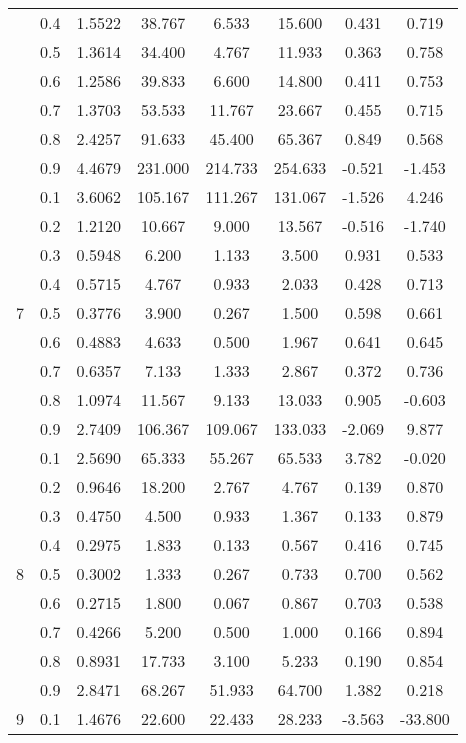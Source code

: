 \documentclass[11pt,a4paper]{report}
\begin{document}
\begin{longtable}{ | c | c || c | c | c | c | c | c | }
 & 0.4 & 1.5522 & 38.767 & 6.533 & 15.600 & 0.431 & 0.719 \\
 & 0.5 & 1.3614 & 34.400 & 4.767 & 11.933 & 0.363 & 0.758 \\
 & 0.6 & 1.2586 & 39.833 & 6.600 & 14.800 & 0.411 & 0.753 \\
 & 0.7 & 1.3703 & 53.533 & 11.767 & 23.667 & 0.455 & 0.715 \\
 & 0.8 & 2.4257 & 91.633 & 45.400 & 65.367 & 0.849 & 0.568 \\
 & 0.9 & 4.4679 & 231.000 & 214.733 & 254.633 & -0.521 & -1.453 \\
 \hline
\multirow{9}{*}{7} & 0.1 & 3.6062 & 105.167 & 111.267 & 131.067 & -1.526 & 4.246 \\
 & 0.2 & 1.2120 & 10.667 & 9.000 & 13.567 & -0.516 & -1.740 \\
 & 0.3 & 0.5948 & 6.200 & 1.133 & 3.500 & 0.931 & 0.533 \\
 & 0.4 & 0.5715 & 4.767 & 0.933 & 2.033 & 0.428 & 0.713 \\
 & 0.5 & 0.3776 & 3.900 & 0.267 & 1.500 & 0.598 & 0.661 \\
 & 0.6 & 0.4883 & 4.633 & 0.500 & 1.967 & 0.641 & 0.645 \\
 & 0.7 & 0.6357 & 7.133 & 1.333 & 2.867 & 0.372 & 0.736 \\
 & 0.8 & 1.0974 & 11.567 & 9.133 & 13.033 & 0.905 & -0.603 \\
 & 0.9 & 2.7409 & 106.367 & 109.067 & 133.033 & -2.069 & 9.877 \\
 \hline
\multirow{9}{*}{8} & 0.1 & 2.5690 & 65.333 & 55.267 & 65.533 & 3.782 & -0.020 \\
 & 0.2 & 0.9646 & 18.200 & 2.767 & 4.767 & 0.139 & 0.870 \\
 & 0.3 & 0.4750 & 4.500 & 0.933 & 1.367 & 0.133 & 0.879 \\
 & 0.4 & 0.2975 & 1.833 & 0.133 & 0.567 & 0.416 & 0.745 \\
 & 0.5 & 0.3002 & 1.333 & 0.267 & 0.733 & 0.700 & 0.562 \\
 & 0.6 & 0.2715 & 1.800 & 0.067 & 0.867 & 0.703 & 0.538 \\
 & 0.7 & 0.4266 & 5.200 & 0.500 & 1.000 & 0.166 & 0.894 \\
 & 0.8 & 0.8931 & 17.733 & 3.100 & 5.233 & 0.190 & 0.854 \\
 & 0.9 & 2.8471 & 68.267 & 51.933 & 64.700 & 1.382 & 0.218 \\
 \hline
\multirow{9}{*}{9} & 0.1 & 1.4676 & 22.600 & 22.433 & 28.233 & -3.563 & -33.800 \\

\end{longtable}
\end{document}
